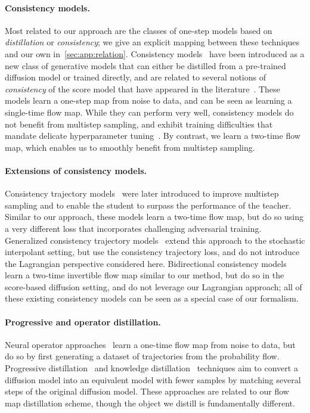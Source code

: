 \paragraph{Consistency models.}
%
Most related to our approach are the classes of one-step models based on \textit{distillation} or \textit{consistency}; we give an explicit mapping between these techniques and our own in~\cref{sec:app:relation}.
%
Consistency models~\citep{song_consistency_2023} have been introduced as a new class of generative models that can either be distilled from a pre-trained diffusion model or trained directly, and are related to several notions of \textit{consistency} of the score model that have appeared in the literature~\citep{lai_equivalence_2023, lai_improving_2023, shen_self-consistency_2022, boffi_probability_2023, daras_consistent_2023}.
%
These models learn a one-step map from noise to data, and can be seen as learning a single-time flow map.
%
While they can perform very well, consistency models do not benefit from multistep sampling, and exhibit training difficulties that mandate delicate hyperparameter tuning~\citep{song_improved_2023}.
%
By contrast, we learn a two-time flow map, which enables us to smoothly benefit from multistep sampling.

\paragraph{Extensions of consistency models.}
%
Consistency trajectory models~\citep{kim_consistency_2024} were later introduced to improve multistep sampling and to enable the student to surpass the performance of the teacher.
%
Similar to our approach, these models learn a two-time flow map, but do so using a very different loss that incorporates challenging adversarial training.
%
Generalized consistency trajectory models~\citep{kim_generalized_2024} extend this approach to the stochastic interpolant setting, but use the consistency trajectory loss, and do not introduce the Lagrangian perspective considered here.
%
Bidirectional consistency models~\citep{li_bidirectional_2024} learn a two-time invertible flow map similar to our method, but do so in the score-based diffusion setting, and do not leverage our Lagrangian approach; all of these existing consistency models can be seen as a special case of our formalism.

\paragraph{Progressive and operator distillation.}
%
Neural operator approaches~\citep{zheng_fast_2023} learn a one-time flow map from noise to data, but do so by first generating a dataset of trajectories from the probability flow.
%
Progressive distillation~\citep{salimans_progressive_2022} and knowledge distillation~\citep{luhman_knowledge_2021} techniques aim to convert a diffusion model into an equivalent model with fewer samples by matching several steps of the original diffusion model.
%
These approaches are related to our flow map distillation scheme, though the object we distill is fundamentally different.
